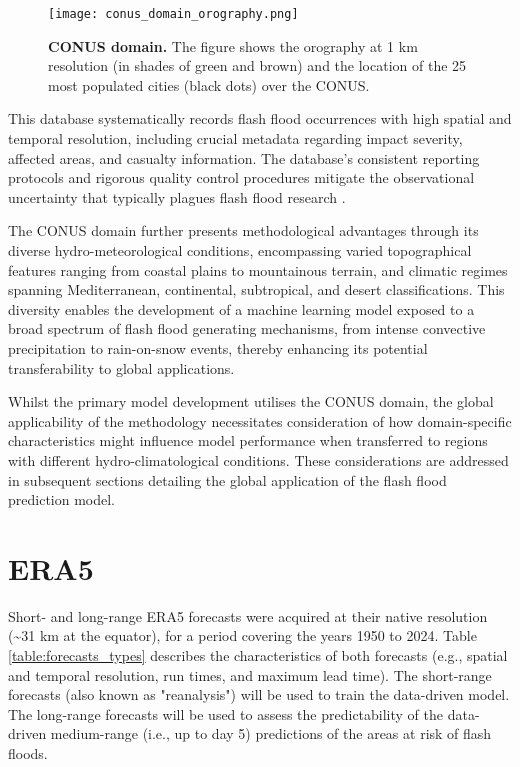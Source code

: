 \begin{figure}[htbp]
\centering
\texttt{[image: conus\_domain\_orography.png]}
\caption{\textbf{CONUS domain.} The figure shows the orography at 1 km resolution (in shades of green and brown) and the location of the 25 most populated cities (black dots) over the CONUS.}
\label{fig:conus_domain}
\end{figure}

This database systematically records flash flood occurrences with high spatial and temporal resolution, including crucial metadata regarding impact severity, affected areas, and casualty information. The database's consistent reporting protocols and rigorous quality control procedures mitigate the observational uncertainty that typically plagues flash flood research \citep{Panwar_2020}.

The CONUS domain further presents methodological advantages through its diverse hydro-meteorological conditions, encompassing varied topographical features ranging from coastal plains to mountainous terrain, and climatic regimes spanning Mediterranean, continental, subtropical, and desert classifications. This diversity enables the development of a machine learning model exposed to a broad spectrum of flash flood generating mechanisms, from intense convective precipitation to rain-on-snow events, thereby enhancing its potential transferability to global applications.

Whilst the primary model development utilises the CONUS domain, the global applicability of the methodology necessitates consideration of how domain-specific characteristics might influence model performance when transferred to regions with different hydro-climatological conditions. These considerations are addressed in subsequent sections detailing the global application of the flash flood prediction model.


\section{ERA5}
\label{datasets_era5}

Short- and long-range ERA5 forecasts were acquired at their native resolution (\textasciitilde31 km at the equator), for a period covering the years 1950 to 2024. Table \ref{table:forecasts_types} describes the characteristics of both forecasts (e.g., spatial and temporal resolution, run times, and maximum lead time). The short-range forecasts (also known as "reanalysis") will be used to train the data-driven model. The long-range forecasts will be used to assess the predictability of the data-driven medium-range (i.e., up to day 5) predictions of the areas at risk of flash floods.

